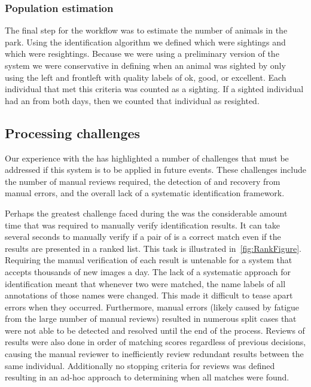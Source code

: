         \subsubsection{Population estimation}
            The final step for the \GZC{} workflow was to estimate the number of animals in the park.  Using the
            identification algorithm we defined which \annots{} were sightings and which were resightings. Because we
            were using a preliminary version of the system we were conservative in defining when an animal was sighted
            by only using the left and frontleft \annots{} with quality labels of ok, good, or excellent.  Each
            individual that met this criteria was counted as a sighting.  If a sighted individual had an \annot{} from
            both days, then we counted that individual as resighted.

    \subsection{Processing challenges}
        Our experience with the \GZCFull{} has highlighted a number of challenges that must be addressed if this system
        is to be applied in future events. These challenges include the number of manual reviews required, the detection
        of and recovery from manual errors, and the overall lack of a systematic identification framework.

        Perhaps the greatest challenge faced during the \GZC{} was the considerable amount time that was required to
        manually verify identification results. It can take several seconds to manually verify if a pair of \annots{} is
        a correct match even if the results are presented in a ranked list. This task is illustrated
        in~\cref{fig:RankFigure}. Requiring the manual verification of each result is untenable for a system that
        accepts thousands of new images a day. The lack of a systematic approach for identification meant that whenever
        two \annots{} were matched, the name labels of all annotations of those names were changed. This made it
        difficult to tease apart errors when they occurred. Furthermore, manual errors (likely caused by fatigue from
        the large number of manual reviews) resulted in numerous split cases that were not able to be detected and
        resolved until the end of the process. Reviews of results were also done in order of matching scores regardless
        of previous decisions, causing the manual reviewer to inefficiently review redundant results between the same
        individual. Additionally no stopping criteria for reviews was defined resulting in an ad-hoc approach to
        determining when all matches were found.

